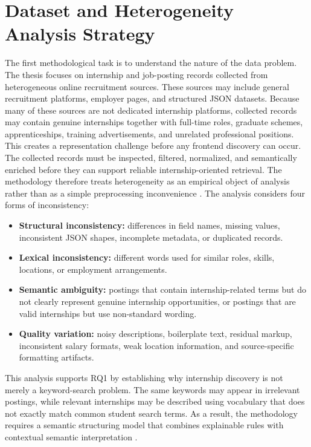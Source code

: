 \section{Dataset and Heterogeneity Analysis Strategy}


The first methodological task is to understand the nature of the data problem. The thesis focuses on internship
and job-posting records collected from heterogeneous online recruitment sources. These sources may include
general recruitment platforms, employer pages, and structured JSON datasets. Because many of these sources
are not dedicated internship platforms, collected records may contain genuine internships together with full-time
roles, graduate schemes, apprenticeships, training advertisements, and unrelated professional positions.
This creates a representation challenge before any frontend discovery can occur. The collected records must be
inspected, filtered, normalized, and semantically enriched before they can support reliable internship-oriented
retrieval. The methodology therefore treats heterogeneity as an empirical object of analysis rather than as a
simple preprocessing inconvenience \cite{batini2009methodologies, doan2012principles}.
The analysis considers four forms of inconsistency:

\begin{itemize}
    \item \textbf{Structural inconsistency:} differences in field names, missing values, inconsistent JSON shapes,
    incomplete metadata, or duplicated records.
    \item \textbf{Lexical inconsistency:} different words used for similar roles, skills, locations, or employment
    arrangements.
    \item \textbf{Semantic ambiguity:} postings that contain internship-related terms but do not clearly represent
    genuine internship opportunities, or postings that are valid internships but use non-standard wording.
    \item \textbf{Quality variation:} noisy descriptions, boilerplate text, residual markup, inconsistent salary
    formats, weak location information, and source-specific formatting artifacts.
\end{itemize}

This analysis supports RQ1 by establishing why internship discovery is not merely a keyword-search problem.
The same keywords may appear in irrelevant postings, while relevant internships may be described using
vocabulary that does not exactly match common student search terms. As a result, the methodology requires a
semantic structuring model that combines explainable rules with contextual semantic interpretation \cite{manning2008introduction, luan2021sparse}.

